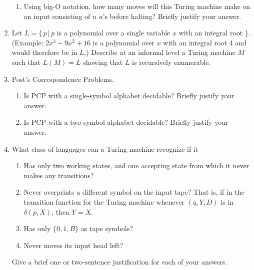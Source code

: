 \documentclass[]{article}
\begin{document}
\begin{enumerate}
\begin{enumerate}
\item Using big-O notation, how many moves will this Turing machine make on an
input consisting of $n$ $a$'s before halting? Briefly justify your answer.
\end{enumerate}

\item Let $L = \{\,p\,|\,p$ is a polynomial over a single variable $x$ with an
integral root $\}$. (Example: $2x^3-9x^2+16$ is a polynomial over $x$ with an
integral root $4$ and would therefore be in $L$.) Describe at an informal level
a Turing machine $M$ such that $L(M) = L$ showing that $L$ is recursively
enumerable.

\item Post's Correspondence Problems.
\begin{enumerate}
\item Is PCP with a single-symbol alphabet decidable? Briefly justify your
answer.

\item Is PCP with a two-symbol alphabet decidable? Briefly justify your answer.
\end{enumerate}

\item What class of languages can a Turing machine recognize if it
\begin{enumerate}
\item Has only two working states, and one accepting state from which it never
makes any transitions?

\item Never overprints a different symbol on the input tape? That is, if in the
transition function for the Turing machine whenever $(q, Y, D)$ is in
$\delta(p,X)$, then $Y = X$.

\item Has only $\{0, 1, B\}$ as tape symbols?

\item Never moves its input head left?
\end{enumerate}

Give a brief one or two-sentence justification for each of your answers.
\end{enumerate}
\end{document}
